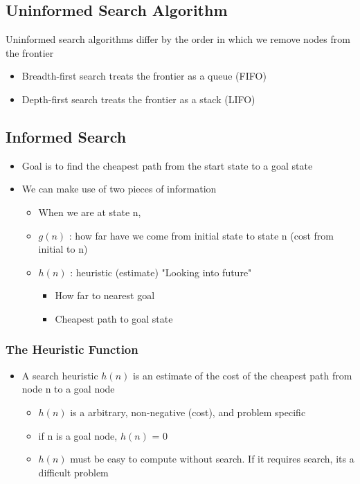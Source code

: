 \documentclass{article}
\begin{document}
\subsection{Uninformed Search Algorithm}

Uninformed search algorithms differ by the order in which we remove nodes from the frontier
\begin{itemize}
\item Breadth-first search treats the frontier as a queue (FIFO)
\item Depth-first search treats the frontier as a stack (LIFO)
\end{itemize}

\subsection{Informed Search}

\begin{itemize}
\item Goal is to find the cheapest path from the start state to a goal state
\item We can make use of two pieces of information
\begin{itemize}
\item When we are at state n,
\item \(g(n)\) : how far have we come from initial state to state n (cost from initial to n) 
\item \(h(n)\) : heuristic (estimate) "Looking into future"
\begin{itemize}
\item How far to nearest goal 
\item Cheapest path to goal state
\end{itemize} 
\end{itemize}
\end{itemize}

\subsubsection{The Heuristic Function}
\begin{itemize}
\item A search heuristic \(h(n)\) is an estimate of the cost of the cheapest path from node n to a goal node
\begin{itemize}
\item \(h(n)\) is a arbitrary, non-negative (cost), and problem specific
\item if n is a goal node, \(h(n)\) = 0
\item \(h(n)\) must be easy to compute without search. If it requires search, its a difficult problem
\end{itemize}
\end{itemize}
\end{document}
